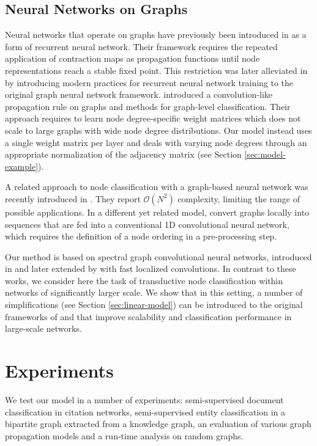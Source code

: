 \documentclass{article} %
\begin{document}
\subsection{Neural Networks on Graphs} Neural networks that operate on graphs have previously been introduced in \cite{gori2005new, scarselli2009graph} as a form of recurrent neural network. Their framework requires the repeated application of contraction maps as propagation functions until node representations reach a stable fixed point. This restriction was later alleviated in \cite{li2015gated} by introducing modern practices for recurrent neural network training to the original graph neural network framework. \cite{duvenaud2015convolutional} introduced a convolution-like propagation rule on graphs and methods for graph-level classification. Their approach requires to learn node degree-specific weight matrices which does not scale to large graphs with wide node degree distributions. Our model instead uses a single weight matrix per layer and deals with varying node degrees through an appropriate normalization of the adjacency matrix (see Section \ref{sec:model-example}).

A related approach to node classification with a graph-based neural network was recently introduced in \cite{atwood2016diffusion}. They report $\mathcal{O}(N^2)$ complexity, limiting the range of possible applications. In a different yet related model, \cite{niepert2016learning} convert graphs locally into sequences that are fed into a conventional 1D convolutional neural network, which requires the definition of a node ordering in a pre-processing step.

Our method is based on spectral graph convolutional neural networks, introduced in \cite{bruna2014spectral} and later extended by \cite{defferrard2016convolutional} with fast localized convolutions. In contrast to these works, we consider here the task of transductive node classification within networks of significantly larger scale. We show that in this setting, a number of simplifications (see Section \ref{sec:linear-model}) can be introduced to the original frameworks of \cite{bruna2014spectral} and \cite{defferrard2016convolutional} that improve scalability and classification performance in large-scale networks.

\section{Experiments}
We test our model in a number of experiments: semi-supervised document classification in citation networks, semi-supervised entity classification in a bipartite graph extracted from a knowledge graph, an evaluation of various graph propagation models and a run-time analysis on random graphs.
\end{document}
